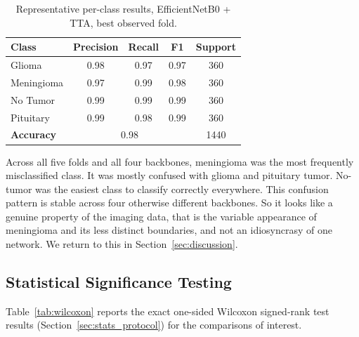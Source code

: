 \documentclass[11pt]{article}
\begin{document}
\begin{table}[htbp]
\centering
\caption{Representative per-class results, EfficientNetB0 + TTA, best observed fold.}
\label{tab:perclass}
\small
\begin{tabular*}{\textwidth}{@{\extracolsep{\fill}}lcccc@{}}
\toprule
\textbf{Class} & \textbf{Precision} & \textbf{Recall} & \textbf{F1} & \textbf{Support} \\
\midrule
Glioma      & 0.98 & 0.97 & 0.97 & 360 \\
Meningioma  & 0.97 & 0.99 & 0.98 & 360 \\
No Tumor    & 0.99 & 0.99 & 0.99 & 360 \\
Pituitary   & 0.99 & 0.98 & 0.99 & 360 \\
\textbf{Accuracy} & \multicolumn{3}{c}{0.98} & 1440 \\
\bottomrule
\end{tabular*}
\end{table}

Across all five folds and all four backbones, meningioma was the most frequently misclassified class. It was mostly confused with glioma and pituitary tumor. No-tumor was the easiest class to classify correctly everywhere. This confusion pattern is stable across four otherwise different backbones. So it looks like a genuine property of the imaging data, that is the variable appearance of meningioma and its less distinct boundaries, and not an idiosyncrasy of one network. We return to this in Section~\ref{sec:discussion}.

\subsection{Statistical Significance Testing}
\label{sec:stats_results}

Table~\ref{tab:wilcoxon} reports the exact one-sided Wilcoxon signed-rank test results (Section~\ref{sec:stats_protocol}) for the comparisons of interest.
\end{document}
